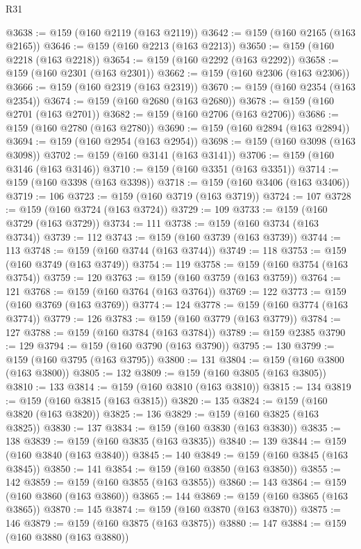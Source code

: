 \begin{lexlean}{R31}
\begin{coremodule}
@3638 := @159 (@160 @2119 (@163 @2119))
@3642 := @159 (@160 @2165 (@163 @2165))
@3646 := @159 (@160 @2213 (@163 @2213))
@3650 := @159 (@160 @2218 (@163 @2218))
@3654 := @159 (@160 @2292 (@163 @2292))
@3658 := @159 (@160 @2301 (@163 @2301))
@3662 := @159 (@160 @2306 (@163 @2306))
@3666 := @159 (@160 @2319 (@163 @2319))
@3670 := @159 (@160 @2354 (@163 @2354))
@3674 := @159 (@160 @2680 (@163 @2680))
@3678 := @159 (@160 @2701 (@163 @2701))
@3682 := @159 (@160 @2706 (@163 @2706))
@3686 := @159 (@160 @2780 (@163 @2780))
@3690 := @159 (@160 @2894 (@163 @2894))
@3694 := @159 (@160 @2954 (@163 @2954))
@3698 := @159 (@160 @3098 (@163 @3098))
@3702 := @159 (@160 @3141 (@163 @3141))
@3706 := @159 (@160 @3146 (@163 @3146))
@3710 := @159 (@160 @3351 (@163 @3351))
@3714 := @159 (@160 @3398 (@163 @3398))
@3718 := @159 (@160 @3406 (@163 @3406))
@3719 := 106
@3723 := @159 (@160 @3719 (@163 @3719))
@3724 := 107
@3728 := @159 (@160 @3724 (@163 @3724))
@3729 := 109
@3733 := @159 (@160 @3729 (@163 @3729))
@3734 := 111
@3738 := @159 (@160 @3734 (@163 @3734))
@3739 := 112
@3743 := @159 (@160 @3739 (@163 @3739))
@3744 := 113
@3748 := @159 (@160 @3744 (@163 @3744))
@3749 := 118
@3753 := @159 (@160 @3749 (@163 @3749))
@3754 := 119
@3758 := @159 (@160 @3754 (@163 @3754))
@3759 := 120
@3763 := @159 (@160 @3759 (@163 @3759))
@3764 := 121
@3768 := @159 (@160 @3764 (@163 @3764))
@3769 := 122
@3773 := @159 (@160 @3769 (@163 @3769))
@3774 := 124
@3778 := @159 (@160 @3774 (@163 @3774))
@3779 := 126
@3783 := @159 (@160 @3779 (@163 @3779))
@3784 := 127
@3788 := @159 (@160 @3784 (@163 @3784))
@3789 := @159 @2385
@3790 := 129
@3794 := @159 (@160 @3790 (@163 @3790))
@3795 := 130
@3799 := @159 (@160 @3795 (@163 @3795))
@3800 := 131
@3804 := @159 (@160 @3800 (@163 @3800))
@3805 := 132
@3809 := @159 (@160 @3805 (@163 @3805))
@3810 := 133
@3814 := @159 (@160 @3810 (@163 @3810))
@3815 := 134
@3819 := @159 (@160 @3815 (@163 @3815))
@3820 := 135
@3824 := @159 (@160 @3820 (@163 @3820))
@3825 := 136
@3829 := @159 (@160 @3825 (@163 @3825))
@3830 := 137
@3834 := @159 (@160 @3830 (@163 @3830))
@3835 := 138
@3839 := @159 (@160 @3835 (@163 @3835))
@3840 := 139
@3844 := @159 (@160 @3840 (@163 @3840))
@3845 := 140
@3849 := @159 (@160 @3845 (@163 @3845))
@3850 := 141
@3854 := @159 (@160 @3850 (@163 @3850))
@3855 := 142
@3859 := @159 (@160 @3855 (@163 @3855))
@3860 := 143
@3864 := @159 (@160 @3860 (@163 @3860))
@3865 := 144
@3869 := @159 (@160 @3865 (@163 @3865))
@3870 := 145
@3874 := @159 (@160 @3870 (@163 @3870))
@3875 := 146
@3879 := @159 (@160 @3875 (@163 @3875))
@3880 := 147
@3884 := @159 (@160 @3880 (@163 @3880))

\end{coremodule}
\end{lexlean}
